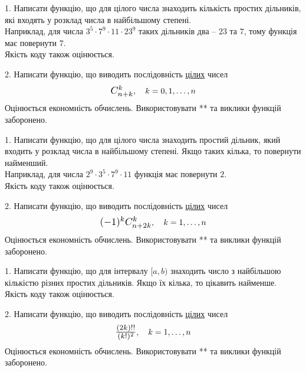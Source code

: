 \documentclass[12pt, ukrainian]{article}
\begin{document}
\begin{Large}
1. Написати функцію, що для цілого числа знаходить кількість простих дільників, які входять у розклад числа в найбільшому степені. \\ Наприклад, для числа $3^5{\cdot}7^9{\cdot}11{\cdot}23^{9}$ таких дільників два – $23$ та $7$, тому функція має повернути $7$.\\	Якість коду також оцінюється. 



\vspace{10mm}

\newpage

2. 
Написати функцію, що виводить послідовність \underline{цілих} чисел
$$\scalebox{1.2}{$C_{n+k}^{k}$}, \quad k=0,1,\ldots,n$$
Оцінюється економність обчислень. Використовувати ** та виклики функцій заборонено.

\newpage




1. Написати функцію, що для цілого числа знаходить простий дільник, який входить у розклад числа в найбільшому степені. Якщо таких кілька, то повернути найменший. \\ Наприклад, для числа $2^{9}{\cdot}3^5{\cdot}7^9{\cdot}11$ функція має повернути $2$.\\	Якість коду також оцінюється. 



\vspace{10mm}

\newpage

2. 
Написати функцію, що виводить послідовність \underline{цілих} чисел
$$\scalebox{1.2}{$(-1)^{k}C_{n+2k}^{k}$}, \quad k=1,\ldots,n$$
Оцінюється економність обчислень. Використовувати ** та виклики функцій заборонено.

\newpage




1. Написати функцію, що для інтервалу $[a, b)$ знаходить число з найбільшою кількістю різних простих дільників. Якщо їх кілька, то цікавить найменше.\\	Якість коду також оцінюється. 



\vspace{10mm}

\newpage

2. 
Написати функцію, що виводить послідовність \underline{цілих} чисел
$$\scalebox{1.2}{$\frac{(2k)!!}{(k!)^2}$}, \quad k=1,\ldots,n$$
Оцінюється економність обчислень. Використовувати ** та виклики функцій заборонено.

\end{Large}

\end{document}

